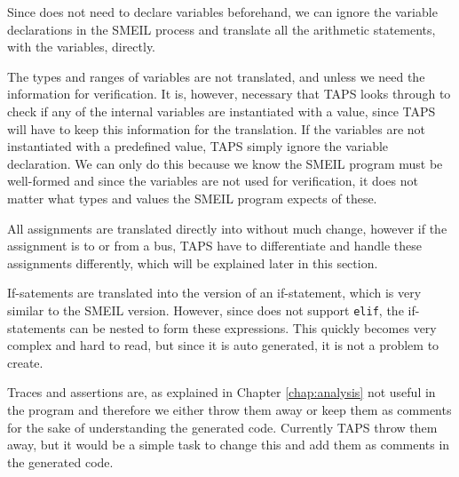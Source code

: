 Since \cspm{} does not need to declare variables beforehand, we can ignore the variable declarations in the SMEIL process and translate all the arithmetic statements, with the variables, directly.


The types and ranges of variables are not translated, and unless we need the information for verification. It is, however, necessary that TAPS looks through to check if any of the internal variables are instantiated with a value, since TAPS will have to keep this information for the translation. If the variables are not instantiated with a predefined value, TAPS simply ignore the variable declaration. We can only do this because we know the SMEIL program must be well-formed and since the variables are not used for verification, it does not matter what types and values the SMEIL program expects of these.

All assignments are translated directly into \cspm{} without much change, however if the assignment is to or from a bus, TAPS have to differentiate and handle these assignments differently, which will be explained later in this section.

If-satements are translated into the \cspm{} version of an if-statement, which is very similar to the SMEIL version. However, since \cspm{} does not support \texttt{elif}, the \cspm{} if-statements can be nested to form these expressions. This quickly becomes very complex and hard to read, but since it is auto generated, it is not a problem to create.


Traces and assertions are, as explained in Chapter \ref{chap:analysis} not useful in the \cspm{} program and therefore we either throw them away or keep them as comments for the sake of understanding the generated code. Currently TAPS throw them away, but it would be a simple task to change this and add them as comments in the generated \cspm{} code.

